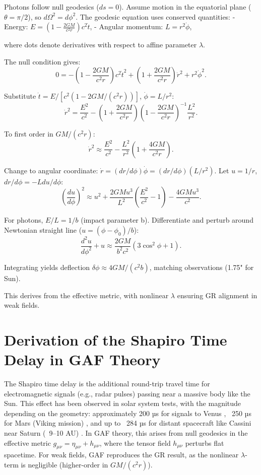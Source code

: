 \documentclass{article}
\begin{document}
Photons follow null geodesics (\( ds = 0 \)). Assume motion in the equatorial plane (\( \theta = \pi/2 \)), so \( d\Omega^2 = d\phi^2 \). The geodesic equation uses conserved quantities:
- Energy: \( E = \left(1 - \frac{2GM}{c^2 r}\right) c^2 \dot{t} \),
- Angular momentum: \( L = r^2 \dot{\phi} \),

where dots denote derivatives with respect to affine parameter \( \lambda \).

The null condition gives:
\[
0 = -\left(1 - \frac{2GM}{c^2 r}\right) c^2 \dot{t}^2 + \left(1 + \frac{2GM}{c^2 r}\right) \dot{r}^2 + r^2 \dot{\phi}^2.
\]

Substitute \( \dot{t} = E / [c^2 (1 - 2GM/(c^2 r))] \), \( \dot{\phi} = L / r^2 \):
\[
\dot{r}^2 = \frac{E^2}{c^2} - \left(1 + \frac{2GM}{c^2 r}\right) \left(1 - \frac{2GM}{c^2 r}\right)^{-1} \frac{L^2}{r^2}.
\]

To first order in \( GM/(c^2 r) \):
\[
\dot{r}^2 \approx \frac{E^2}{c^2} - \frac{L^2}{r^2} \left(1 + \frac{4GM}{c^2 r}\right).
\]

Change to angular coordinate: \( \dot{r} = (dr/d\phi) \dot{\phi} = (dr/d\phi) (L / r^2) \). Let \( u = 1/r \), \( dr/d\phi = -L du/d\phi \):
\[
\left( \frac{du}{d\phi} \right)^2 \approx u^2 + \frac{2GM u^3}{L^2} \left( \frac{E^2}{c^2} - 1 \right) - \frac{4GM u^3}{c^2}.
\]

For photons, \( E/L = 1/b \) (impact parameter b). Differentiate and perturb around Newtonian straight line (\( u = (\phi - \phi_0)/b \)):
\[
\frac{d^2 u}{d\phi^2} + u \approx \frac{2GM}{b^2 c^2} (3 \cos^2 \phi + 1).
\]

Integrating yields deflection \( \delta \phi \approx 4GM/(c^2 b) \), matching observations (1.75" for Sun).

This derives from the effective metric, with nonlinear \( \lambda \) ensuring GR alignment in weak fields.

\section{Derivation of the Shapiro Time Delay in GAF Theory}

The Shapiro time delay is the additional round-trip travel time for electromagnetic signals (e.g., radar pulses) passing near a massive body like the Sun. This effect has been observed in solar system tests, with the magnitude depending on the geometry: approximately 200 µs for signals to Venus \cite{Shapiro1968}, ~250 µs for Mars (Viking mission) \cite{Reasenberg1979}, and up to ~284 µs for distant spacecraft like Cassini near Saturn (~9–10 AU) \cite{Bertotti2003}. In GAF theory, this arises from null geodesics in the effective metric \( g_{\mu\nu} = \eta_{\mu\nu} + h_{\mu\nu} \), where the tensor field \( h_{\mu\nu} \) perturbs flat spacetime. For weak fields, GAF reproduces the GR result, as the nonlinear \( \lambda \)-term is negligible (higher-order in \( GM/(c^2 r) \)).
\end{document}
